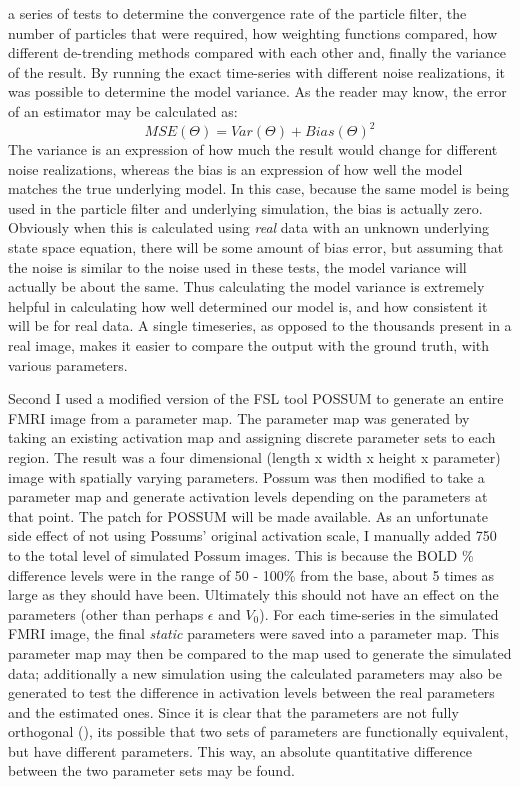 a series of tests to determine the convergence rate of the particle filter, the number
of particles that were required, how weighting functions compared, how different de-trending
methods compared with each other and, finally the variance of the result. By running the exact
time-series with different noise realizations, it was possible to determine the model variance.
As the reader may know, the error of an estimator may be calculated as:
\begin{equation}
MSE(\Theta) = Var(\Theta) + Bias(\Theta)^2
\end{equation}
The variance is an expression of how much the result would change for different noise realizations,
whereas the bias is an expression of how well the model matches the true underlying model. In
this case, because the same model is being used in the particle filter and underlying simulation,
the bias is actually zero. Obviously when this is calculated using \emph{real} data with an unknown
underlying state space equation, there will be some amount of bias error, but assuming that the
noise is similar to the noise used in these tests, the model variance will actually be about the
same. Thus calculating the model variance is extremely helpful in calculating how well determined
our model is, and how consistent it will be for real data. A single timeseries, as opposed to the
thousands present in a real image, makes it easier to 
compare the output with the ground truth, with various parameters. 

Second I used a modified version of the FSL tool 
POSSUM to generate an entire FMRI image from a parameter map. The parameter map was generated
by taking an existing activation map and assigning discrete parameter sets to each region.
The result was a four dimensional (length x width
x height x parameter) image with spatially varying parameters. Possum was then modified
to take a parameter map and generate activation levels depending on the parameters at that
point. The patch for POSSUM will be made available. As an unfortunate side effect of 
not using Possums' original activation scale, I manually added 750 to the total level of
simulated Possum images. This is because the BOLD \% difference levels were in the range
of 50 - 100\% from the base, about 5 times as large as they should have been. Ultimately
this should not have an effect on the parameters (other than perhaps $\epsilon$ and $V_0$). 
For each time-series in the simulated FMRI image, the final \emph{static} parameters were saved
into a parameter map. This parameter map may then be compared to the map used to generate the 
simulated data; additionally a new simulation using the calculated parameters may also be 
generated to test the difference in activation levels between the real parameters and the
estimated ones. Since it is clear that the parameters are not fully orthogonal 
(\cite{Deneux2006}), its possible that two sets of parameters are functionally equivalent,
but have different parameters. This way, an absolute 
quantitative difference between the two parameter sets may be found.

